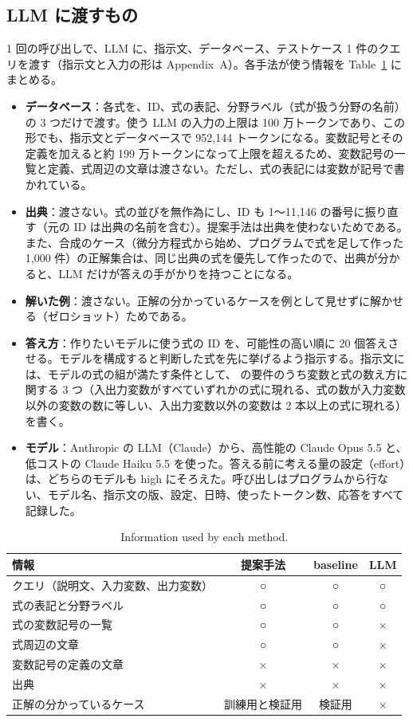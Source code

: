 \documentclass[a4j,dvipdfmx,10pt]{jresume}
\begin{document}
\subsection{LLM に渡すもの}
1 回の呼び出しで、LLM に、指示文、データベース、テストケース 1 件のクエリを渡す（指示文と入力の形は Appendix~A）。各手法が使う情報を Table~\ref{tab:inputs} にまとめる。
\begin{itemize}[leftmargin=1.5em]
  \item \textbf{データベース}：各式を、ID、式の表記、分野ラベル（式が扱う分野の名前）の 3 つだけで渡す。使う LLM の入力の上限は 100 万トークンであり、この形でも、指示文とデータベースで 952{,}144 トークンになる。変数記号とその定義を加えると約 199 万トークンになって上限を超えるため、変数記号の一覧と定義、式周辺の文章は渡さない。ただし、式の表記には変数が記号で書かれている。
  \item \textbf{出典}：渡さない。式の並びを無作為にし、ID も 1〜11{,}146 の番号に振り直す（元の ID は出典の名前を含む）。提案手法は出典を使わないためである。また、合成のケース（微分方程式から始め、プログラムで式を足して作った 1{,}000 件）の正解集合は、同じ出典の式を優先して作ったので、出典が分かると、LLM だけが答えの手がかりを持つことになる。
  \item \textbf{解いた例}：渡さない。正解の分かっているケースを例として見せずに解かせる（ゼロショット）ためである。
  \item \textbf{答え方}：作りたいモデルに使う式の ID を、可能性の高い順に 20 個答えさせる。モデルを構成すると判断した式を先に挙げるよう指示する。指示文には、モデルの式の組が満たす条件として、\citet{CombineEq} の要件のうち変数と式の数え方に関する 3 つ（入出力変数がすべていずれかの式に現れる、式の数が入力変数以外の変数の数に等しい、入出力変数以外の変数は 2 本以上の式に現れる）を書く。
  \item \textbf{モデル}：Anthropic の LLM（Claude）から、高性能の Claude Opus 5.5 と、低コストの Claude Haiku 5.5 を使った。答える前に考える量の設定（effort）は、どちらのモデルも high にそろえた。呼び出しはプログラムから行ない、モデル名、指示文の版、設定、日時、使ったトークン数、応答をすべて記録した。
\end{itemize}

\begin{table}[t]\centering
\footnotesize
\caption{Information used by each method.}
\label{tab:inputs}
\begin{tabular}{@{}lccc@{}}
\toprule
情報 & 提案手法 & baseline & LLM \\
\midrule
クエリ（説明文、入力変数、出力変数） & ○ & ○ & ○ \\
式の表記と分野ラベル & ○ & ○ & ○ \\
式の変数記号の一覧 & ○ & ○ & × \\
式周辺の文章 & ○ & ○ & × \\
変数記号の定義の文章 & × & × & × \\
出典 & × & × & × \\
正解の分かっているケース & 訓練用と検証用 & 検証用 & × \\
\bottomrule
\end{tabular}
\end{table}
\end{document}
